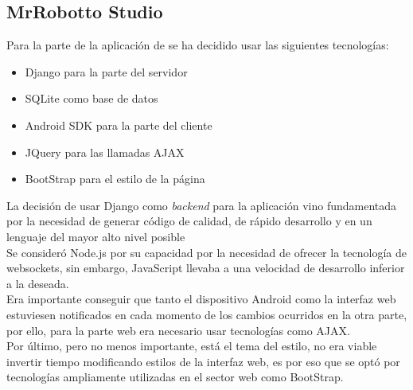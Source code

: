 \subsection{MrRobotto Studio}

Para la parte de la aplicación de \studio se ha decidido usar las siguientes tecnologías:

\begin{itemize}
\item Django para la parte del servidor
\item SQLite como base de datos
\item Android SDK para la parte del cliente
\item JQuery para las llamadas AJAX
\item BootStrap para el estilo de la página
\end{itemize}

La decisión de usar Django como \textit{backend} para la aplicación vino fundamentada por la necesidad de generar código de calidad, de rápido desarrollo y en un lenguaje del mayor alto nivel posible\\

Se consideró Node.js por su capacidad por la necesidad de ofrecer la tecnología de websockets, sin embargo, JavaScript llevaba a una velocidad de desarrollo inferior a la deseada.\\

Era importante conseguir que tanto el dispositivo Android como la interfaz web estuviesen notificados en cada momento de los cambios ocurridos en la otra parte, por ello, para la parte web era necesario usar tecnologías como AJAX.\\

Por último, pero no menos importante, está el tema del estilo, no era viable invertir tiempo modificando estilos de la interfaz web, es por eso que se optó por tecnologías ampliamente utilizadas en el sector web como BootStrap.